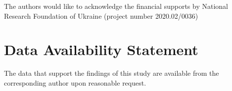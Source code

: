 \documentclass[%
 aip,jap,
 amsmath,amssymb,
 reprint,%
]{revtex4-1}
\begin{document}
\begin{acknowledgments}
The authors would like to acknowledge the financial supports by National Research Foundation  of Ukraine
(project number 2020.02/0036)
\end{acknowledgments}

\section*{Data Availability Statement}

The data that support the findings of this study are available from the corresponding author upon reasonable request.

%
\end{document}
